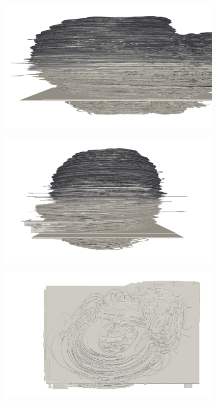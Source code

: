 \begin{figure}
  \centering
  \includegraphics[width=0.9\textheight]{Ch7/Figs/Rat28/contours/whole_negative_x_geometric}
  \caption{}
  \label{fig:image1.png}
\end{figure}

\begin{figure}
  \centering
  \includegraphics[width=0.9\textheight]{Ch7/Figs/Rat28/contours/whole_positive_y_geometric}
  \caption{}
  \label{fig:image1.png}
\end{figure}

\begin{figure}
  \centering
  \includegraphics[width=0.9\textheight]{Ch7/Figs/Rat28/contours/whole_positive_z_geometric}
  \caption{}
  \label{fig:image1.png}
\end{figure}

